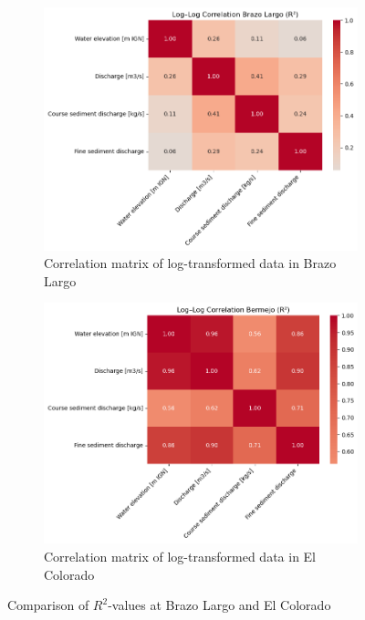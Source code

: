 \begin{figure}[h!]
    \centering
    \begin{subfigure}[b]{0.48\linewidth}
        \centering
        \includegraphics[width=\linewidth]{figures/ch5/logcorrelations Brazo Largo.png}
        \caption{Correlation matrix of log-transformed data in Brazo Largo}
        \label{fig:logcorrelation brazo}
    \end{subfigure}
    \hfill
    \begin{subfigure}[b]{0.48\linewidth}
        \centering
        \includegraphics[width=\linewidth]{figures/ch5/logcorrelations Bermejo.png}
        \caption{Correlation matrix of log-transformed data in El Colorado}
        \label{fig:logcorrelation bermejo}
    \end{subfigure}
    
    \caption{Comparison of $R^2$-values at Brazo Largo and El Colorado}
    \label{fig:correlationmatrices}
\end{figure}


